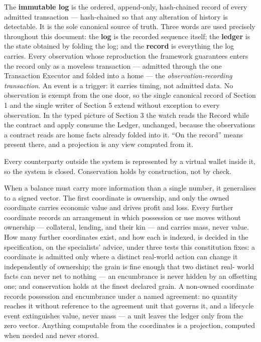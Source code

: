 \documentclass[11pt,a4paper]{article}
\newcommand{\clabel}[1]{\leavevmode\hypertarget{clause-#1}{}%
  \marginpar{\raggedright\scriptsize\ttfamily\textcolor{gray}{#1}}}
\begin{document}
\clabel{C-4.8}The \textbf{immutable log} is the ordered, append-only, hash-chained
record of every admitted transaction --- hash-chained so that any
alteration of history is detectable. It is the sole canonical source of truth. Three words are used precisely
throughout this document: the \textbf{log} is the recorded sequence itself;
the \textbf{ledger} is the state obtained by folding the log; and the
\textbf{record} is everything the log carries. Every observation whose
reproduction the framework guarantees enters the record only as a moveless
transaction --- admitted through the one Transaction Executor and folded
into a home --- the \emph{observation-recording transaction}. An event is a
trigger: it carries timing, not admitted data. No observation is exempt from
the one door, so the single canonical record of Section 1 and the single
writer of Section 5 extend without exception to every observation. In the
typed picture of Section 3 the watch reads the Record while the contract and
apply consume the Ledger, unchanged, because the observations a contract
reads are home facts already folded into it. ``On the record'' means present
there, and a projection is any view computed from it.

\clabel{C-4.9}Every counterparty outside the system is represented by a virtual wallet
inside it, so the system is closed. Conservation holds by construction,
not by check.

\clabel{C-4.10}When a balance must carry more information than a single
number, it generalises to a signed vector. The first coordinate is
ownership, and only the owned coordinate carries economic value and drives
profit and loss. Every further coordinate records an arrangement in which
possession or use moves without ownership --- collateral, lending, and their
kin --- and carries mass, never value. How many further coordinates exist,
and how each is indexed, is decided in the specification, on the
specialists' advice, under three tests this constitution fixes: a coordinate
is admitted only where a distinct real-world action can change it
independently of ownership; the grain is fine enough that two distinct real-
world facts can never net to nothing --- an encumbrance is never hidden by
an offsetting one; and conservation holds at the finest declared grain.
\clabel{C-4.11}A non-owned coordinate records possession and encumbrance
under a named agreement: no quantity reaches it without reference to the
agreement unit that governs it, and a lifecycle event extinguishes value,
never mass --- a unit leaves the ledger only from the zero vector. Anything
computable from the coordinates is a projection, computed when needed and
never stored.
\end{document}
